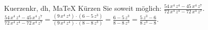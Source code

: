 \begin{MAufgabe}{Kuerzen}{kr, dh, MaTeX}
K\"urzen Sie soweit m\"oglich: $\frac{54\, x^4\, z^4 - 45\, x^4\, z^7}{72\, x^4\, z^4 - 72\, x^4\, z^7}$.\\ 
\ifLsg\MLoesung
\quad $\frac{54\, x^4\, z^4 - 45\, x^4\, z^7}{72\, x^4\, z^4 - 72\, x^4\, z^7}=\frac{(9\, x^4\, z^4)\cdot(6 - 5\, z^3)}{(9\, x^4\, z^4)\cdot(8 - 8\, z^3)}=\frac{6 - 5\, z^3}{8 - 8\, z^3}=\frac{5\, z^3 - 6}{8\, z^3 - 8}$.\else\relax\fi
 \end{MAufgabe}